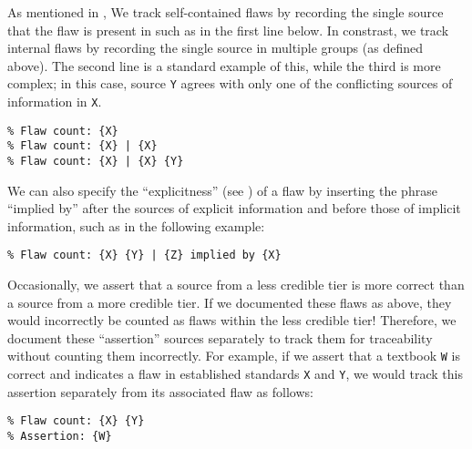 As mentioned in , \oneSrcDistinct{} We track
self-contained flaws by recording the single source that the flaw is present
in such as in the first line below. In constrast, we track internal flaws
by recording the single source in multiple groups (as defined above). The
second line is a standard example of this, while the third is more complex;
in this case, source \texttt{Y} agrees with only one of the conflicting
sources of information in \texttt{X}.
\begin{displayquote}
    \texttt{\% Flaw count: \{X\}\\\% Flaw count: \{X\} | \{X\}\\
        \% Flaw count: \{X\} | \{X\} \{Y\}}
\end{displayquote}
We can also specify the ``explicitness'' (see ) of a
flaw by inserting the phrase ``implied by'' after the sources of explicit
information and before those of implicit information, such as in the
following example:
\begin{displayquote}
    \texttt{\% Flaw count: \{X\} \{Y\} | \{Z\} implied by \{X\}}
\end{displayquote}\label{less-cred-assert}%
Occasionally, we assert that a source from a less credible tier is more
correct than a source from a more credible tier.
If we documented these flaws as above, they would incorrectly be counted as
flaws within the less credible tier! Therefore, we document these
``assertion'' sources separately to track them for traceability without
counting them incorrectly.
For example, if we assert that a textbook \texttt{W} is correct and
indicates a flaw in established standards \texttt{X} and \texttt{Y}, we
would track this assertion separately from its associated flaw as follows:
\begin{displayquote}
    \texttt{\% Flaw count: \{X\} \{Y\}\\\% Assertion: \{W\}}
\end{displayquote}

